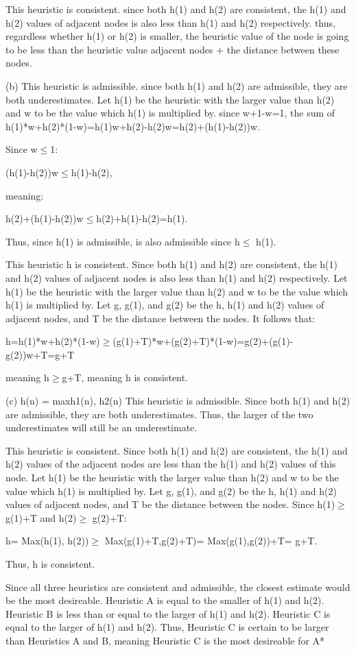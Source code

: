 \documentclass{article}
\begin{document}
\begin{enumerate}
This heuristic is consistent. since both h(1) and h(2) are consistent, the h(1) and h(2) values of adjacent nodes is also less than h(1) and h(2) respectively. thus, regardless whether h(1) or h(2) is smaller, the heuristic value of the node is going to be less than the heuristic value adjacent nodes + the distance between these nodes. 

(b) This heuristic is admissible. since both h(1) and h(2) are admissible, they are both underestimates. Let h(1) be the heuristic with the larger value than h(2) and w to be the value which h(1) is multiplied by. since w+1-w=1, the sum of h(1)*w+h(2)*(1-w)=h(1)w+h(2)-h(2)w=h(2)+(h(1)-h(2))w. 

Since w$\le$1:

(h(1)-h(2))w$\le$h(1)-h(2), 

meaning:

h(2)+(h(1)-h(2))w$\le$h(2)+h(1)-h(2)=h(1). 

Thus, since h(1) is admissible, is also admissible since h$\le$ h(1). 

This heuristic h is consistent. Since both h(1) and h(2) are consistent, the h(1) and h(2) values of adjacent nodes is also less than h(1) and h(2) respectively. Let h(1) be the heuristic with the larger value than h(2) and w to be the value which h(1) is multiplied by. Let g, g(1), and g(2) be the h, h(1) and h(2) values of adjacent nodes, and T be the distance between the nodes. It follows that:

h=h(1)*w+h(2)*(1-w)$\ge$(g(1)+T)*w+(g(2)+T)*(1-w)=g(2)+(g(1)-g(2))w+T=g+T

meaning h$\ge$g+T, meaning h is consistent. 

(c)
h(n) = max{h1(n), h2(n)}
This heuristic is admissible. Since both h(1) and h(2) are admissible, they are both underestimates. Thus, the larger of the two underestimates will still be an underestimate. 

This heuristic is consistent. Since both h(1) and h(2) are consistent, the h(1) and h(2) values of the adjacent nodes are less than the h(1) and h(2) values of this node.  Let h(1) be the heuristic with the larger value than h(2) and w to be the value which h(1) is multiplied by. Let g, g(1), and g(2) be the h, h(1) and h(2) values of adjacent nodes, and T be the distance between the nodes. Since h(1)$\ge$ g(1)+T and h(2)$\ge$ g(2)+T:

h= Max(h(1), h(2))$\ge$ Max(g(1)+T,g(2)+T)= Max(g(1),g(2))+T= g+T. 

Thus, h is consistent. 

Since all three heuristics are consistent and admissible, the closest estimate would be the most desireable. Heuristic A is equal to the smaller of h(1) and h(2). Heuristic B is less than or equal to the larger of h(1) and h(2). Heuristic C is equal to the larger of h(1) and h(2). Thus, Heuristic C is certain to be larger than Heuristics A and B, meaning Heuristic C is the most desireable for A*
\end{enumerate}
\end{document}
